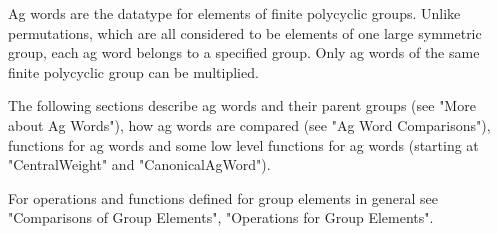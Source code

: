 %

Ag words  are  the  {\GAP}  datatype  for  elements of finite  polycyclic
groups.  Unlike permutations, which are all considered to be  elements of
one  large symmetric group,  each  ag word belongs to  a specified group.
Only ag words of the same finite polycyclic group can be multiplied.

The following  sections describe  ag words  and their parent  groups (see
"More  about Ag  Words"),   how  ag  words  are  compared (see  "Ag  Word
Comparisons"), functions for ag words and some low level functions for ag
words (starting at "CentralWeight" and "CanonicalAgWord").

For operations  and functions defined  for group elements  in general see
"Comparisons of Group Elements", "Operations for Group Elements".



